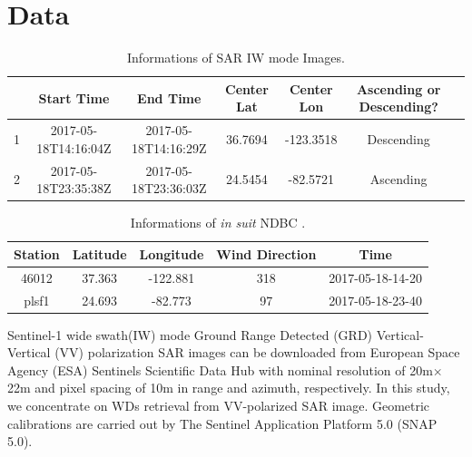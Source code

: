 \documentclass{article}
\begin{document}
\section{Data}
\label{sec:data}
\begin{table}[htpb]
 \setlength{\belowcaptionskip}{0.1cm}
\centering
\caption{Informations of SAR IW mode Images.}
  \begin{tabular}{ccccccc}
    \hline
    &Start Time&End Time&Center Lat&Center Lon&Ascending or Descending?\\
    \hline
    1&2017-05-18T14:16:04Z&2017-05-18T14:16:29Z&36.7694&-123.3518&Descending\\
    \hline
    2&2017-05-18T23:35:38Z&2017-05-18T23:36:03Z&24.5454&-82.5721&Ascending\\
    \hline
  \end{tabular}
  \label{tab:1}
\end{table}

\begin{table}[htpb]
 \setlength{\belowcaptionskip}{0.1cm}
\centering
\caption{Informations of {\it in suit} NDBC .}
  \begin{tabular}{ccccc}
    \hline
    Station&Latitude&Longitude&Wind Direction&Time\\
    \hline
    46012&37.363&-122.881&318&2017-05-18-14-20\\
    \hline
    plsf1&24.693&-82.773&97&2017-05-18-23-40\\
    \hline
  \end{tabular}
  \label{tab:2}
\end{table}
Sentinel-1 wide swath(IW) mode Ground Range Detected (GRD) Vertical-Vertical (VV) polarization SAR images can be downloaded from European Space Agency (ESA) Sentinels Scientiﬁc Data Hub with nominal resolution of 20m$\times$22m and pixel spacing of 10m in range and azimuth, respectively. In this study, we concentrate on WDs retrieval from VV-polarized SAR image. Geometric calibrations are carried out by The Sentinel Application Platform 5.0 (SNAP 5.0)\cite{James:2017kn}.
\end{document}
